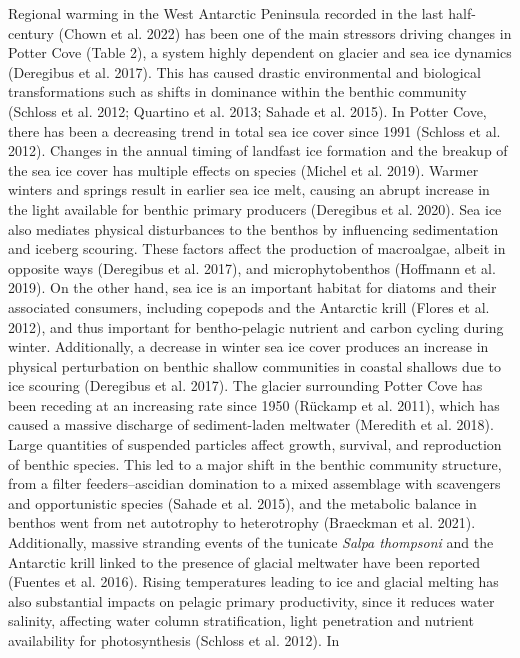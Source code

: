 \documentclass[
]{article}
\begin{document}
Regional warming in the West Antarctic Peninsula recorded in the last
half-century (Chown et al. 2022) has been one of the main stressors
driving changes in Potter Cove (Table 2), a system highly dependent on
glacier and sea ice dynamics (Deregibus et al. 2017). This has caused
drastic environmental and biological transformations such as shifts in
dominance within the benthic community (Schloss et al. 2012; Quartino et
al. 2013; Sahade et al. 2015). In Potter Cove, there has been a
decreasing trend in total sea ice cover since 1991 (Schloss et al.
2012). Changes in the annual timing of landfast ice formation and the
breakup of the sea ice cover has multiple effects on species (Michel et
al. 2019). Warmer winters and springs result in earlier sea ice melt,
causing an abrupt increase in the light available for benthic primary
producers (Deregibus et al. 2020). Sea ice also mediates physical
disturbances to the benthos by influencing sedimentation and iceberg
scouring. These factors affect the production of macroalgae, albeit in
opposite ways (Deregibus et al. 2017), and microphytobenthos (Hoffmann
et al. 2019). On the other hand, sea ice is an important habitat for
diatoms and their associated consumers, including copepods and the
Antarctic krill (Flores et al. 2012), and thus important for
bentho-pelagic nutrient and carbon cycling during winter. Additionally,
a decrease in winter sea ice cover produces an increase in physical
perturbation on benthic shallow communities in coastal shallows due to
ice scouring (Deregibus et al. 2017). The glacier surrounding Potter
Cove has been receding at an increasing rate since 1950 (Rückamp et al.
2011), which has caused a massive discharge of sediment-laden meltwater
(Meredith et al. 2018). Large quantities of suspended particles affect
growth, survival, and reproduction of benthic species. This led to a
major shift in the benthic community structure, from a filter
feeders--ascidian domination to a mixed assemblage with scavengers and
opportunistic species (Sahade et al. 2015), and the metabolic balance in
benthos went from net autotrophy to heterotrophy (Braeckman et al.
2021). Additionally, massive stranding events of the tunicate
\emph{Salpa thompsoni} and the Antarctic krill linked to the presence of
glacial meltwater have been reported (Fuentes et al. 2016). Rising
temperatures leading to ice and glacial melting has also substantial
impacts on pelagic primary productivity, since it reduces water
salinity, affecting water column stratification, light penetration and
nutrient availability for photosynthesis (Schloss et al. 2012). In
\end{document}

